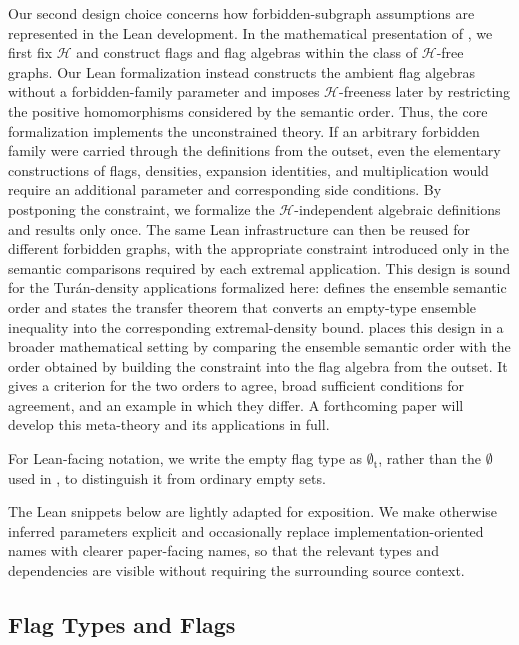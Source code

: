 \documentclass{article}
\newcommand{\emptyt}{\emptyset_{\mathrm{t}}}
\begin{document}
Our second design choice concerns how forbidden-subgraph assumptions are
represented in the Lean development.  In the mathematical presentation of
, we first fix \(\mathcal{H}\) and construct flags and
flag algebras within the class of \(\mathcal{H}\)-free graphs.  Our Lean
formalization instead constructs the ambient flag algebras without a
forbidden-family parameter and imposes \(\mathcal{H}\)-freeness later by
restricting the positive homomorphisms considered by the semantic order.  Thus,
the core formalization implements the unconstrained theory.  If an arbitrary
forbidden family were carried through the definitions from the outset, even
the elementary constructions of flags, densities, expansion identities, and
multiplication would require an additional parameter and corresponding side
conditions.  By postponing the constraint, we formalize the
\(\mathcal{H}\)-independent algebraic definitions and results only once.  The
same Lean infrastructure can then be reused for different forbidden graphs,
with the appropriate constraint introduced only in the semantic comparisons
required by each extremal application.  This design is sound for the
Tur\'an-density applications formalized here:  defines the
ensemble semantic order and states the transfer theorem that converts an
empty-type ensemble inequality into the corresponding extremal-density bound.
 places this design in a broader mathematical setting by
comparing the ensemble semantic order with the order obtained by building the
constraint into the flag algebra from the outset.  It gives a criterion for
the two orders to agree, broad sufficient conditions for agreement, and an
example in which they differ.  A forthcoming paper will develop this
meta-theory and its applications in full.

For Lean-facing notation, we write the empty flag type as \(\emptyt\), rather
than the \(\emptyset\) used in , to distinguish it from
ordinary empty sets.

The Lean snippets below are lightly adapted for exposition.  We make otherwise
inferred parameters explicit and occasionally replace implementation-oriented
names with clearer paper-facing names, so that the relevant types and
dependencies are visible without requiring the surrounding source context.

\subsection{Flag Types and Flags}
\label{sec:flagtypes}
\end{document}

